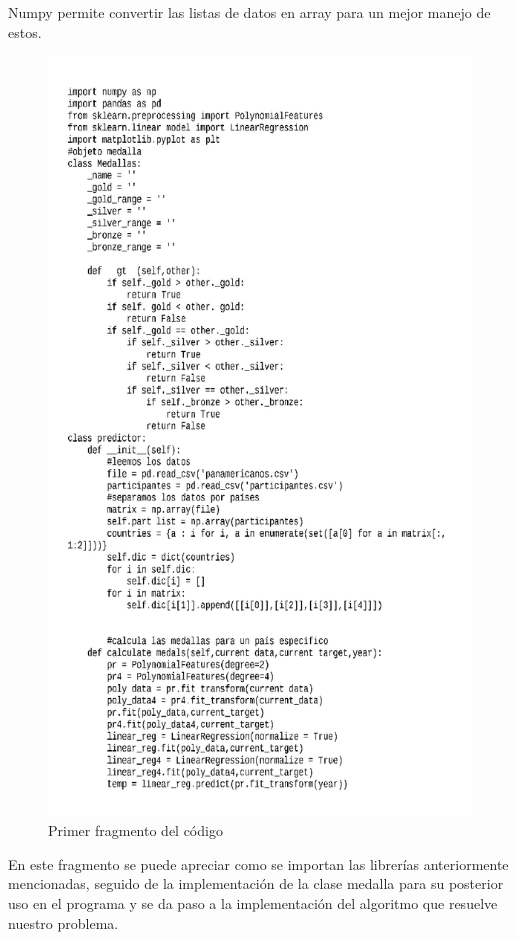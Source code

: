 \documentclass[a4paper,12pt]{article}
\begin{document}
\cline{-} Numpy permite convertir las listas de datos en array para un mejor manejo de estos.\begin{figure}[hbtp]
\caption{Primer fragmento del c\'{o}digo}
\includegraphics[scale=0.7]{first_part.png}
\end{figure}
\newpage
\cline{-} En este fragmento se puede apreciar como se importan las librer\'{i}as anteriormente mencionadas, seguido de la implementaci\'{o}n de la clase medalla para su posterior uso en el programa y se da paso a la implementaci\'{o}n del algoritmo que resuelve nuestro problema.
\end{document}
